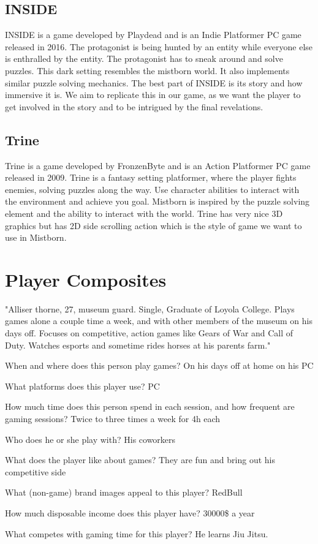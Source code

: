 \documentclass{article}
\begin{document}
\subsection{INSIDE}
INSIDE is a game developed by Playdead and is an Indie Platformer PC game released in 2016.
The protagonist is being hunted by an entity while everyone else is enthralled by the entity. The protagonist has to sneak around and solve puzzles. This dark setting resembles the mistborn world. It also implements similar puzzle solving mechanics. The best part of INSIDE is its story and how immersive it is. We aim to replicate this in our game, as we want the player to get involved in the story and to be intrigued by the final revelations.

\subsection{Trine}
Trine is a game developed by FronzenByte and is an Action Platformer PC game released in 2009.
Trine is a fantasy setting platformer, where the player fights enemies, solving puzzles along the way. Use character abilities to interact with the environment and achieve you goal. Mistborn is inspired by the puzzle solving element and the ability to interact with the world. Trine has very nice 3D graphics but has 2D side scrolling action which is the style of game we want to use in Mistborn.

\section{Player Composites}

"Alliser thorne, 27, museum guard. Single, Graduate of Loyola College. Plays games alone a couple time a week, and with other members of the museum on his days off. Focuses on competitive, action games like Gears of War and Call of Duty. Watches esports and sometime rides horses at his parents farm."
\begin{description}
	\item When and where does this person play games? On his days off at home on his PC
	\item What platforms does this player use? PC 
	\item How much time does this person spend in each session, and
	how frequent are gaming sessions? Twice to three times a week for 4h each
	\item Who does he or she play with? His coworkers 
	\item What does the player like about games? They are fun and bring out his competitive side
	\item What (non-game) brand images appeal to this player? RedBull
	\item How much disposable income does this player have? 30000\$ a year
	\item What competes with gaming time for this player? He learns Jiu Jitsu.
\end{description}
\end{document}
